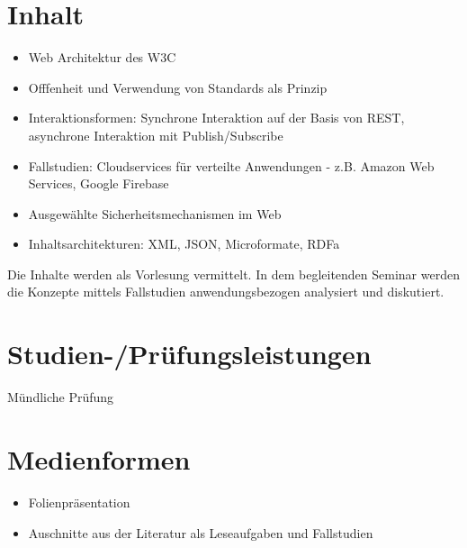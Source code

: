 \section*{Inhalt\label{/mi-2017/modulbeschreibungen-bachelor/BA_Grundlagen_des_Web}}\label{inhaltpathlabelmi-2017modulbeschreibungen-bachelorbaux5fgrundlagenux5fdesux5fweb}

\begin{itemize}
\tightlist
\item
  Web Architektur des W3C
\item
  Offfenheit und Verwendung von Standards als Prinzip
\item
  Interaktionsformen: Synchrone Interaktion auf der Basis von REST,
  asynchrone Interaktion mit Publish/Subscribe
\item
  Fallstudien: Cloudservices für verteilte Anwendungen - z.B. Amazon Web
  Services, Google Firebase
\item
  Ausgewählte Sicherheitsmechanismen im Web
\item
  Inhaltsarchitekturen: XML, JSON, Microformate, RDFa
\end{itemize}

Die Inhalte werden als Vorlesung vermittelt. In dem begleitenden Seminar
werden die Konzepte mittels Fallstudien anwendungsbezogen analysiert und
diskutiert.

\section*{Studien-/Prüfungsleistungen\label{/mi-2017/modulbeschreibungen-bachelor/BA_Grundlagen_des_Web}}\label{studien-pruxfcfungsleistungenpathlabelmi-2017modulbeschreibungen-bachelorbaux5fgrundlagenux5fdesux5fweb}

Mündliche Prüfung

\section*{Medienformen\label{/mi-2017/modulbeschreibungen-bachelor/BA_Grundlagen_des_Web}}\label{medienformenpathlabelmi-2017modulbeschreibungen-bachelorbaux5fgrundlagenux5fdesux5fweb}

\begin{itemize}
\tightlist
\item
  Folienpräsentation
\item
  Auschnitte aus der Literatur als Leseaufgaben und Fallstudien
\end{itemize}

